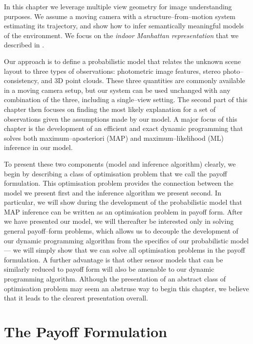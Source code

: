 In this chapter we leverage multiple view geometry for image
understanding purposes. We assume a moving camera with a
structure--from--motion system estimating its trajectory, and show how
to infer semantically meaningful models of the environment. We focus
on the \textit{indoor Manhattan
  representation}\cite{Lee09,Flint10eccv} that we described in
.

Our approach is to define a probabilistic model that relates the
unknown scene layout to three types of observations: photometric image
features, stereo photo--consistency, and 3D point clouds. These three
quantities are commonly available in a moving camera setup, but our
system can be used unchanged with any combination of the three,
including a single--view setting. The second part of this chapter then
focuses on finding the most likely explanation for a set of
observations given the assumptions made by our model. A major focus of
this chapter is the development of an efficient and exact dynamic
programming that solves both maximum--aposteriori (MAP) and
maximum--likelihood (ML) inference in our model.

To present these two components (model and inference algorithm)
clearly, we begin by describing a class of optimisation problem that
we call the payoff formulation. This optimisation problem
provides the connection between the model we present first and
the inference algorithm we present second. In particular, we will show
during the development of the probabilistic model that MAP inference
can be written as an optimisation problem in payoff form. After we
have presented our model, we will thereafter be interested only in
solving general payoff--form problems, which allows us to decouple the
development of our dynamic programming algorithm from the specifics of
our probabilistic model --- we will simply show that we can solve all
optimisation problems in the payoff formulation. A further advantage
is that other sensor models that can be similarly reduced to payoff
form will also be amenable to our dynamic programming
algorithm. Although the presentation of an abstract class of
optimisation problem may seem an abstruse way to begin this chapter,
we believe that it leads to the clearest presentation overall.

\section{The Payoff Formulation}

